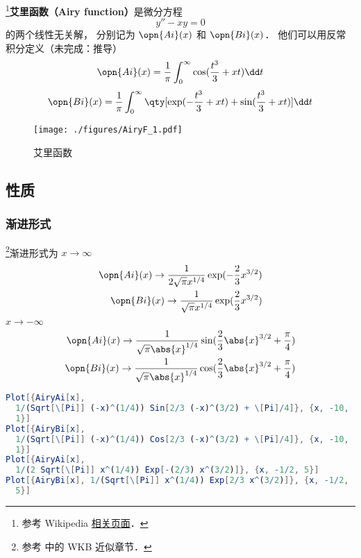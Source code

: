 
\begin{issues}
\issueDraft
\end{issues}

\footnote{参考 Wikipedia \href{https://en.wikipedia.org/wiki/Airy_function}{相关页面}．}\textbf{艾里函数（Airy function）}是微分方程
\begin{equation}
y'' - xy = 0
\end{equation}
的两个线性无关解， 分别记为 $\opn{Ai}(x)$ 和 $\opn{Bi}(x)$． 他们可以用反常积分定义（未完成：推导）
\begin{equation}
\opn{Ai}(x)=\frac 1\pi \int_0^\infty \cos(\frac{t^3}{3}+xt)\dd t
\end{equation}
\begin{equation}
\opn{Bi}(x)=\frac 1\pi \int_0^\infty \qty[\exp(-\frac{t^3}{3}+xt)+\sin(\frac{t^3}{3}+xt)]\dd t
\end{equation}

\begin{figure}[ht]
\centering
\texttt{[image: ./figures/AiryF\_1.pdf]}
\caption{艾里函数} \label{AiryF_fig1}
\end{figure}
\subsection{性质}
\subsubsection{渐进形式}
\footnote{参考 \cite{GriffQ} 中的 WKB 近似章节．}渐进形式为 $x \to \infty$
\begin{align}
\opn{Ai}(x) \to \frac{1}{2\sqrt{\pi} x^{1/4}} \exp(-\frac{2}{3}x^{3/2})\\
\opn{Bi}(x) \to \frac{1}{\sqrt{\pi} x^{1/4}} \exp(\frac{2}{3}x^{3/2})
\end{align}
$x \to -\infty$
\begin{align}
\opn{Ai}(x) \to \frac{1}{\sqrt{\pi} \abs{x}^{1/4}} \sin(\frac{2}{3}\abs{x}^{3/2}+\frac{\pi}{4})\\
\opn{Bi}(x) \to \frac{1}{\sqrt{\pi} \abs{x}^{1/4}} \cos(\frac{2}{3}\abs{x}^{3/2}+\frac{\pi}{4})
\end{align}

\begin{lstlisting}[language=Mathematica]
Plot[{AiryAi[x], 
  1/(Sqrt[\[Pi]] (-x)^(1/4)) Sin[2/3 (-x)^(3/2) + \[Pi]/4]}, {x, -10, 
  1}]
Plot[{AiryBi[x], 
  1/(Sqrt[\[Pi]] (-x)^(1/4)) Cos[2/3 (-x)^(3/2) + \[Pi]/4]}, {x, -10, 
  1}]
Plot[{AiryAi[x], 
  1/(2 Sqrt[\[Pi]] x^(1/4)) Exp[-(2/3) x^(3/2)]}, {x, -1/2, 5}]
Plot[{AiryBi[x], 1/(Sqrt[\[Pi]] x^(1/4)) Exp[2/3 x^(3/2)]}, {x, -1/2, 
  5}]
\end{lstlisting}
